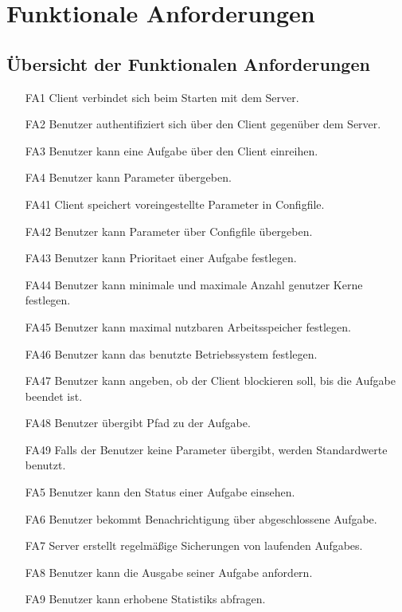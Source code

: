 \documentclass[a4paper,12pt]{article}
\begin{document}
\newpage

\section{Funktionale Anforderungen}

\subsection{Übersicht der  Funktionalen Anforderungen}

\begin{itemize}[nosep]
\leftskip=0.5cm

\item[FA1]	\gls{Client} verbindet sich beim Starten mit dem \gls{Server}.
\item[FA2] \gls{Benutzer} authentifiziert sich über den \gls{Client} gegenüber dem \gls{Server}.
\item[FA3] \gls{Benutzer} kann eine \gls{Aufgabe} über den \gls{Client} einreihen.
\item[FA4] \gls{Benutzer} kann \gls{Parameter} übergeben.
\item[FA41]	\gls{Client} speichert voreingestellte \gls{Parameter} in \gls{Configfile}.
\item[FA42]	\gls{Benutzer} kann \gls{Parameter} über \gls{Configfile} übergeben.
\item[FA43] \gls{Benutzer} kann \gls{Prioritaet} einer \gls{Aufgabe} festlegen.
\item[FA44] \gls{Benutzer} kann minimale und maximale Anzahl genutzer Kerne festlegen.
\item[FA45] \gls{Benutzer} kann maximal nutzbaren Arbeitsspeicher festlegen.
\item[FA46] \gls{Benutzer} kann das benutzte Betriebssystem festlegen.
\item[FA47] \gls{Benutzer} kann angeben, ob der \gls{Client} blockieren soll, bis die \gls{Aufgabe} beendet ist.
\item[FA48] \gls{Benutzer} übergibt Pfad zu der \gls{Aufgabe}.
\item[FA49] Falls der \gls{Benutzer} keine \gls{Parameter} übergibt, werden Standardwerte benutzt.
\item[FA5] \gls{Benutzer} kann den Status einer \gls{Aufgabe} einsehen.
\item[FA6] \gls{Benutzer} bekommt Benachrichtigung über abgeschlossene \gls{Aufgabe}.
\item[FA7] \gls{Server} erstellt regelmäßige Sicherungen von laufenden \glspl{Aufgabe}.
\item[FA8] \gls{Benutzer} kann die Ausgabe seiner \gls{Aufgabe} anfordern.
\item[FA9] \gls{Benutzer} kann erhobene \glspl{Statistik} abfragen.
\end{itemize}
\newpage
\end{document}
